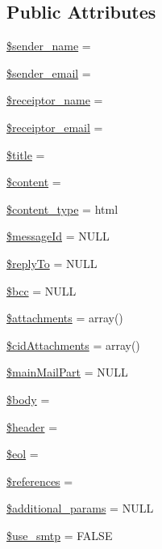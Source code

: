 \subsection*{Public Attributes}
\begin{DoxyCompactItemize}
\item 
\hyperlink{classMail_a0ad6aa18dc8ea8c632bb7a82175e8d68}{\$sender\+\_\+name} = \textquotesingle{}\textquotesingle{}
\item 
\hyperlink{classMail_a94dccbbdc161e818d90e41ad197ebe85}{\$sender\+\_\+email} = \textquotesingle{}\textquotesingle{}
\item 
\hyperlink{classMail_a44df4937f3c8b2691e9bbb1220c667f3}{\$receiptor\+\_\+name} = \textquotesingle{}\textquotesingle{}
\item 
\hyperlink{classMail_aa034785886f8bdcf3a5ed9c86ce8ed14}{\$receiptor\+\_\+email} = \textquotesingle{}\textquotesingle{}
\item 
\hyperlink{classMail_aea1a8697c961d49a688564c5ca16cbcb}{\$title} = \textquotesingle{}\textquotesingle{}
\item 
\hyperlink{classMail_a5a3320973718a2ca8a3fe798bf79c624}{\$content} = \textquotesingle{}\textquotesingle{}
\item 
\hyperlink{classMail_ac933733b17efbb4978a46e557d32c440}{\$content\+\_\+type} = \textquotesingle{}html\textquotesingle{}
\item 
\hyperlink{classMail_a48caf58883e736f50ab87a03147c584a}{\$message\+Id} = N\+U\+LL
\item 
\hyperlink{classMail_a55788852017ccc1716af69cdde26df99}{\$reply\+To} = N\+U\+LL
\item 
\hyperlink{classMail_a2e25b3c43459422d40765d581b165692}{\$bcc} = N\+U\+LL
\item 
\hyperlink{classMail_a93b05b1003cc8ea16b59c00d77f47466}{\$attachments} = array()
\item 
\hyperlink{classMail_a66c6752b550e4e8fd79a63b62815f48f}{\$cid\+Attachments} = array()
\item 
\hyperlink{classMail_ad58544ae1c34119ec852e3c22b855624}{\$main\+Mail\+Part} = N\+U\+LL
\item 
\hyperlink{classMail_acbd542849121b33a76ed63e1c4670e02}{\$body} = \textquotesingle{}\textquotesingle{}
\item 
\hyperlink{classMail_ace98431d0944d23544743094b443d506}{\$header} = \textquotesingle{}\textquotesingle{}
\item 
\hyperlink{classMail_acaebf19cba0b8be83989e241c96f9eb7}{\$eol} = \textquotesingle{}\textquotesingle{}
\item 
\hyperlink{classMail_abcd438320caac44b166df90ba9092fe9}{\$references} = \textquotesingle{}\textquotesingle{}
\item 
\hyperlink{classMail_a38466de017089677f088c9a4025f724f}{\$additional\+\_\+params} = N\+U\+LL
\item 
\hyperlink{classMail_a8fe39b2063dc112d7db67be074142628}{\$use\+\_\+smtp} = F\+A\+L\+SE
\end{DoxyCompactItemize}


